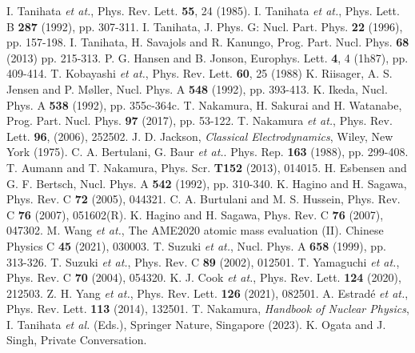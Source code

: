 \begin{thebibliography}{999}
I. Tanihata \textit{et at.}, Phys. Rev. Lett. \textbf{55}, 24 (1985).
I. Tanihata \textit{et at.}, Phys. Lett. B \textbf{287} (1992), pp. 307-311.
I. Tanihata, J. Phys. G: Nucl. Part. Phys. \textbf{22} (1996), pp. 157-198.
I. Tanihata, H. Savajols and R. Kanungo, Prog. Part. Nucl. Phys. \textbf{68} (2013) pp. 215-313.
P. G. Hansen and B. Jonson, Europhys. Lett. \textbf{4}, 4 (1h87), pp. 409-414.
T. Kobayashi \textit{et at.}, Phys. Rev. Lett. \textbf{60}, 25 (1988)
K. Riisager, A. S. Jensen and P. Møller, Nucl. Phys. A \textbf{548} (1992), pp. 393-413.
K. Ikeda, Nucl. Phys. A \textbf{538} (1992), pp. 355c-364c.
T. Nakamura, H. Sakurai and H. Watanabe, Prog. Part. Nucl. Phys. \textbf{97} (2017), pp. 53-122.
T. Nakamura \textit{et at.}, Phys. Rev. Lett. \textbf{96}, (2006), 252502.
J. D. Jackson, \textit{Classical Electrodynamics}, Wiley, New York (1975).
C. A. Bertulani, G. Baur \textit{et at.}. Phys. Rep. \textbf{163} (1988), pp. 299-408.
T. Aumann and T. Nakamura, Phys. Scr. \textbf{T152} (2013), 014015.
H. Esbensen and G. F. Bertsch, Nucl. Phys. A \textbf{542} (1992), pp. 310-340.
K. Hagino and H. Sagawa, Phys. Rev. C \textbf{72} (2005), 044321.
C. A. Burtulani and M. S. Hussein, Phys. Rev. C \textbf{76} (2007), 051602(R).
K. Hagino and H. Sagawa, Phys. Rev. C \textbf{76} (2007), 047302.
M. Wang \textit{et at.}, The AME2020 atomic mass evaluation (II). Chinese Physics C \textbf{45} (2021), 030003.
T. Suzuki \textit{et at.}, Nucl. Phys. A \textbf{658} (1999), pp. 313-326.
T. Suzuki \textit{et at.}, Phys. Rev. C \textbf{89} (2002), 012501.
T. Yamaguchi \textit{et at.}, Phys. Rev. C \textbf{70} (2004), 054320.
K. J. Cook \textit{et at.}, Phys. Rev. Lett. \textbf{124} (2020), 212503.
Z. H. Yang \textit{et at.}, Phys. Rev. Lett. \textbf{126} (2021), 082501. 
A. Estradé \textit{et at.}, Phys. Rev. Lett. \textbf{113} (2014), 132501.
T. Nakamura, \textit{Handbook of Nuclear Physics}, I. Tanihata \textit{et al.} (Eds.), Springer Nature, Singapore (2023).
K. Ogata and J. Singh, Private Conversation.

\end{thebibliography}
